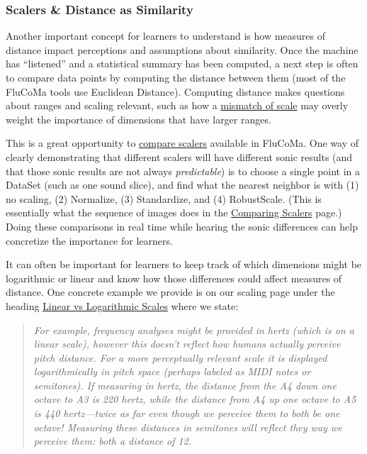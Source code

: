 \documentclass{article}
\begin{document}
\subsubsection{Scalers \& Distance as Similarity}

Another important concept for learners to understand is how measures of
distance impact perceptions and assumptions about similarity. Once the
machine has ``listened'' and a statistical summary has been computed, a
next step is often to compare data points by computing the distance
between them (most of the FluCoMa tools use Euclidean Distance).
Computing distance makes questions about ranges and scaling
relevant, such as how a
\href{https://youtu.be/qom6x1u4_6A?t=1122}{mismatch of scale} may
overly weight the importance of dimensions that have larger ranges.

This is a great opportunity to
\href{https://learn.flucoma.org/learn/comparing-scalers/}{compare
scalers} available in FluCoMa. One way of clearly demonstrating that
different scalers will have different sonic results (and that those
sonic results are not always \emph{predictable}) is to choose a single
point in a DataSet (such as one sound slice), and find what the nearest
neighbor is with (1) no scaling, (2) Normalize, (3) Standardize, and
(4) RobustScale. (This is essentially what the sequence of images does in
the \href{https://learn.flucoma.org/learn/comparing-scalers/}{Comparing
Scalers} page.) Doing these comparisons in real time while hearing the sonic differences
can help concretize the importance for learners.

It can often be important for learners to keep track of which dimensions
might be logarithmic or linear and know how those differences could
affect measures of distance. One concrete example we provide is on our
scaling page under the heading
\href{https://learn.flucoma.org/learn/why-scale/\#linear-vs-logarithmic-scales}{Linear
vs Logarithmic Scales} where we state:

\begin{quote}
\emph{For example, frequency analyses might be provided in hertz (which
is on a linear scale), however this doesn't reflect how humans actually
perceive pitch distance. For a more perceptually relevant scale it is
displayed logarithmically in pitch space (perhaps labeled as MIDI notes
or semitones). If measuring in hertz, the distance from the A4 down one
octave to A3 is 220 hertz, while the distance from A4 up one octave to
A5 is 440 hertz---twice as far even though we perceive them to both be
one octave! Measuring these distances in semitones will reflect
they way we perceive them: both a distance of 12.}
\end{quote}
\end{document}
